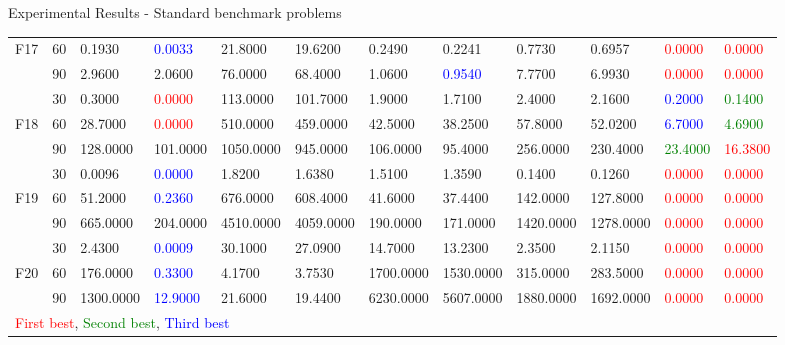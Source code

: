 \documentclass [9pt,times] {beamer}
\begin{document}
\begin{frame}[plain]{Experimental Results - Standard benchmark problems}
\begin{center}
\begin{tabular}{p{0.08in} | p{0.09in} | p{0.25in} |  p{0.23in} |  p{0.25in}|  p{0.25in} |  p{0.25in} | p{0.25in} |  p{0.25in} | p{0.25in} |  p{0.25in} |  p{0.25in}}
F17	&	60	&	0.1930	&\textcolor{blue}{	0.0033	}&	21.8000	&	19.6200	&	0.2490	&	0.2241	&	0.7730	&	0.6957	&\textcolor{red}{	0.0000	}&\textcolor{red}{	0.0000	}\\
	&	90	&	2.9600	&	2.0600	&	76.0000	&	68.4000	&	1.0600	&\textcolor{blue}{	0.9540	}&	7.7700	&	6.9930	&\textcolor{red}{	0.0000	}&\textcolor{red}{	0.0000	}\\
\hline																							
&	30	&	0.3000	&\textcolor{red}{	0.0000	}&	113.0000	&	101.7000	&	1.9000	&	1.7100	&	2.4000	&	2.1600	&\textcolor{blue}{	0.2000	}&\textcolor{green}{	0.1400	}\\
F18	&	60	&	28.7000	&\textcolor{red}{	0.0000	}&	510.0000	&	459.0000	&	42.5000	&	38.2500	&	57.8000	&	52.0200	&\textcolor{blue}{	6.7000	}&\textcolor{green}{	4.6900	}\\
	&90&	128.0000	&	101.0000	&	1050.0000	&	945.0000	&	106.0000	&	95.4000	&	256.0000	&	230.4000	&\textcolor{green}{	23.4000}	&\textcolor{red}{	16.3800	}\\
\hline																							
	&	30	&	0.0096	&\textcolor{blue}{	0.0000	}&	1.8200	&	1.6380	&	1.5100	&	1.3590	&	0.1400	&	0.1260	&\textcolor{red}{	0.0000	}&\textcolor{red}{	0.0000	}\\
F19	&	60	&	51.2000	&\textcolor{blue}{	0.2360	}&	676.0000	&	608.4000	&	41.6000	&	37.4400	&	142.0000	&	127.8000	&\textcolor{red}{	0.0000	}&\textcolor{red}{	0.0000	}\\
	&	90	&	665.0000	&	204.0000	&	4510.0000	&	4059.0000	&	190.0000	&	171.0000	&	1420.0000	&	1278.0000	&\textcolor{red}{	0.0000	}&\textcolor{red}{	0.0000	}\\
\hline																							
	&	30	&	2.4300	&\textcolor{blue}{	0.0009	}&	30.1000	&	27.0900	&	14.7000	&	13.2300	&	2.3500	&	2.1150	&\textcolor{red}{	0.0000	}&\textcolor{red}{	0.0000	}\\
F20	&	60	&	176.0000	&\textcolor{blue}{	0.3300	}&	4.1700	&	3.7530	&	1700.0000	&	1530.0000	&	315.0000	&	283.5000	&\textcolor{red}{	0.0000	}&\textcolor{red}{	0.0000	}\\
	&	90	&	1300.0000	&\textcolor{blue}{	12.9000	}&	21.6000	&	19.4400	&	6230.0000	&	5607.0000	&	1880.0000	&	1692.0000	&\textcolor{red}{	0.0000	}&\textcolor{red}{	0.0000	}\\

	


\hline
\multicolumn{11}{l}{\textcolor{red}{First best}, \textcolor{green}{Second best}, \textcolor{blue}{Third best}}\\
\end{tabular}
\end{center}
  \end{frame}
  
\end{document}
